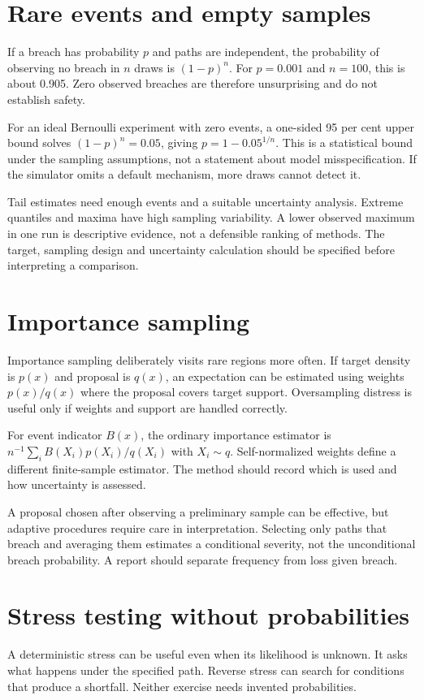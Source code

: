 \section{Rare events and empty samples}
If a breach has probability $p$ and paths are independent, the probability of observing no breach in $n$ draws is $(1-p)^n$. For $p=0.001$ and $n=100$, this is about 0.905. Zero observed breaches are therefore unsurprising and do not establish safety.

For an ideal Bernoulli experiment with zero events, a one-sided 95 per cent upper bound solves $(1-p)^n=0.05$, giving $p=1-0.05^{1/n}$. This is a statistical bound under the sampling assumptions, not a statement about model misspecification. If the simulator omits a default mechanism, more draws cannot detect it.

Tail estimates need enough events and a suitable uncertainty analysis. Extreme quantiles and maxima have high sampling variability. A lower observed maximum in one run is descriptive evidence, not a defensible ranking of methods. The target, sampling design and uncertainty calculation should be specified before interpreting a comparison.

\section{Importance sampling}
Importance sampling deliberately visits rare regions more often. If target density is $p(x)$ and proposal is $q(x)$, an expectation can be estimated using weights $p(x)/q(x)$ where the proposal covers target support. Oversampling distress is useful only if weights and support are handled correctly.

For event indicator $B(x)$, the ordinary importance estimator is $n^{-1}\sum_i B(X_i)p(X_i)/q(X_i)$ with $X_i\sim q$. Self-normalized weights define a different finite-sample estimator. The method should record which is used and how uncertainty is assessed.

A proposal chosen after observing a preliminary sample can be effective, but adaptive procedures require care in interpretation. Selecting only paths that breach and averaging them estimates a conditional severity, not the unconditional breach probability. A report should separate frequency from loss given breach.

\section{Stress testing without probabilities}
A deterministic stress can be useful even when its likelihood is unknown. It asks what happens under the specified path. Reverse stress can search for conditions that produce a shortfall. Neither exercise needs invented probabilities.

